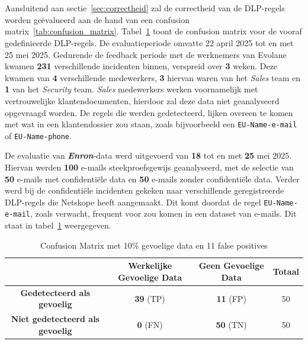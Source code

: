 \section{}
\label{sec:correctheid-resultaten}

Aansluitend aan sectie~\ref{sec:correctheid} zal de correctheid van de DLP-regels worden geëvalueerd aan de hand van een confusion matrix~\ref{tab:confusion_matrix}. 
Tabel~\ref{tab:confusion_matrix-resultaten} toont de confusion matrix voor de vooraf gedefinieerde DLP-regels. 
De evaluatieperiode omvatte 22 april 2025 tot en met 25 mei 2025. 
Gedurende de feedback periode met de werknemers van Evolane kwamen \textbf{231} verschillende incidenten binnen, verspreid over \textbf{3} weken. 
Deze kwamen van \textbf{4} verschillende medewerkers, \textbf{3} hiervan waren van het \textit{Sales} team en \textbf{1} van het \textit{Security} team.
\textit{Sales} medewerkers werken voornamelijk met vertrouwelijke klantendocumenten, hierdoor zal deze data niet geanalyseerd opgevraagd worden.
De regels die werden gedetecteerd, lijken overeen te komen met wat in een klantendossier zou staan, zoals bijvoorbeeld een \texttt{EU-Name-e-mail} of \texttt{EU-Name-phone}.

De evaluatie van \textbf{\textit{Enron}}-data werd uitgevoerd van \textbf{18} tot en met \textbf{25} mei 2025.
Hiervan werden \textbf{100} e-mails steekproefsgewijs geanalyseerd, 
met de selectie van \textbf{50} e-mails met confidentiële data en \textbf{50} e-mails zonder confidentiële data.
Verder werd bij de confidentiële incidenten gekeken naar verschillende geregistreerde DLP-regels die Netskope heeft aangemaakt.
Dit komt doordat de regel \texttt{EU-Name-e-mail}, zoals verwacht, frequent voor zou komen in een dataset van e-mails.
Dit staat in tabel~\ref{tab:confusion_matrix-resultaten} weergegeven.


\begin{table}[h]
    \centering
    \small
    \scriptsize
    \begin{tabular}{|c|c|c|c|}
        \hline
        \textbf{} & \textbf{Werkelijke Gevoelige Data} & \textbf{Geen Gevoelige Data} & \textbf{Totaal} \\ \hline
        \textbf{Gedetecteerd als gevoelig} & \textbf{39} (TP) & \textbf{11} (FP) & 50 \\ \hline
        \textbf{Niet gedetecteerd als gevoelig} & \textbf{0} (FN) & \textbf{50} (TN) & 50 \\ \hline
    \end{tabular}
    \caption{Confusion Matrix met 10\% gevoelige data en 11 false positives}
    \label{tab:confusion_matrix-resultaten}
\end{table}


